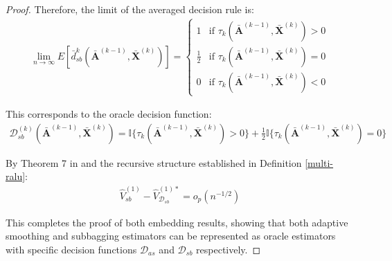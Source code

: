 \documentclass[11pt]{article}
\theoremstyle{referenceplain}
\theoremstyle{referencedefinition}
\theoremstyle{referenceremark}
\begin{document}
\begin{proof}

Therefore, the limit of the averaged decision rule is:
\begin{align*}
\lim_{n \to \infty} E[\bar{d}_{sb}^{k}(\bar{\mathbf{A}}^{(k-1)}, \bar{\mathbf{X}}^{(k)})] = \begin{cases}
1 & \text{if } \tau_k(\bar{\mathbf{A}}^{(k-1)}, \bar{\mathbf{X}}^{(k)}) > 0 \\
\frac{1}{2} & \text{if } \tau_k(\bar{\mathbf{A}}^{(k-1)}, \bar{\mathbf{X}}^{(k)}) = 0 \\
0 & \text{if } \tau_k(\bar{\mathbf{A}}^{(k-1)}, \bar{\mathbf{X}}^{(k)}) < 0
\end{cases}
\end{align*}

This corresponds to the oracle decision function:
\begin{align*}
\mathcal{D}_{sb}^{(k)}(\bar{\mathbf{A}}^{(k-1)}, \bar{\mathbf{X}}^{(k)}) = \mathbb{I}\{\tau_k(\bar{\mathbf{A}}^{(k-1)}, \bar{\mathbf{X}}^{(k)}) > 0\} + \frac{1}{2} \mathbb{I}\{\tau_k(\bar{\mathbf{A}}^{(k-1)}, \bar{\mathbf{X}}^{(k)}) = 0\}
\end{align*}


By Theorem 7 in \citet{shi2020breaking} and the recursive structure established in Definition \ref{multi-ralu}:
\begin{align*}
\widehat{V}_{sb}^{(1)} - \widehat{V}_{\mathcal{D}_{sb}}^{(1)*} = o_p(n^{-1/2})
\end{align*}

This completes the proof of both embedding results, showing that both adaptive smoothing and subbagging estimators can be represented as oracle estimators with specific decision functions $\mathcal{D}_{as}$ and $\mathcal{D}_{sb}$ respectively.
\end{proof}
\end{document}
